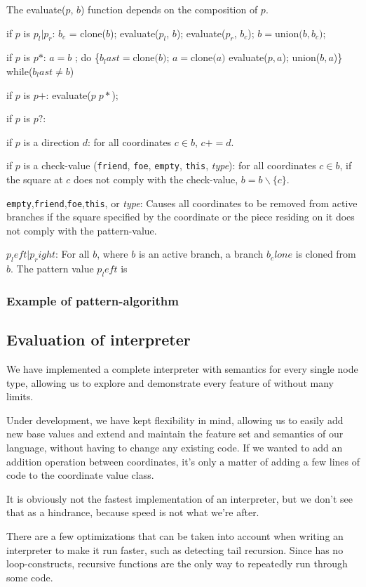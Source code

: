 The evaluate($p$, $b$) function depends on the composition of $p$.
\begin{dlist}
\item if $p$ is $p_l \texttt{|} p_r$: $b_c$ = clone($b$); evaluate($p_l$, $b$); evaluate($p_r$, $b_c$); $b = \text{union(}b, b_c\text{)}$;
\item if $p$ is $p\texttt{*}$: $a = b$ ; do \{$b_last = \text{clone(}b\text{)}$; $a = \text{clone(}a\text{)}$ evaluate($p, a$); union($b, a$)\} while($b_last \neq b$)
\item if $p$ is $p\texttt{+}$: evaluate($p \; p*$);
\item if $p$ is $p\texttt{?}$:
\item if $p$ is a direction $d$: for all coordinates $c \in b$, $c += d$.
\item if $p$ is a check-value (\texttt{friend}, \texttt{foe}, \texttt{empty}, \texttt{this}, \textit{type}): for all coordinates $c \in b$, if the square at $c$ does not comply with the check-value, $b = b \smallsetminus \{c\}$.
\end{dlist}  



\begin{dlist}
\item \texttt{empty},\texttt{friend},\texttt{foe},\texttt{this}, or \textit{type}: Causes all coordinates to be removed from active branches if the square specified by the coordinate or the piece residing on it does not comply with the pattern-value.
\item $p_left \texttt{|} p_right$: For all $b$, where $b$ is an active branch, a branch $b_clone$ is cloned from $b$. The pattern value $p_left$ is 
\end{dlist}
 
\subsubsection{Example of pattern-algorithm}
\label{sec:patternalg}


\subsection{Evaluation of interpreter}
We have implemented a complete interpreter with semantics for every
single node type, allowing us to explore and demonstrate every feature
of \productname{} without many limits.

Under development, we have kept flexibility in mind, allowing us to
easily add new base values and extend and maintain the feature set and
semantics of our language, without having to change any existing code.
If we wanted to add an addition operation between coordinates, it's only
a matter of adding a few lines of code to the coordinate value class.

It is obviously not the fastest implementation of an interpreter, but we
don't see that as a hindrance, because speed is not what we're after.

There are a few optimizations that can be taken into account when
writing an interpreter to make it run faster, such as detecting tail
recursion. Since \productname{} has no loop-constructs, recursive
functions are the only way to repeatedly run through some code.
